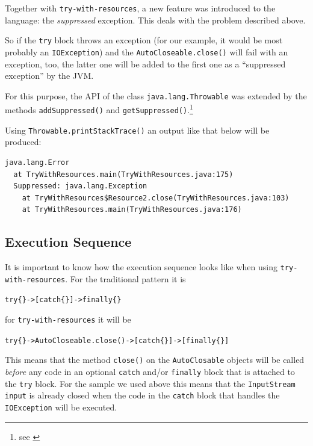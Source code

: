 \documentclass[12pt,a4paper,titlepage, parskip=half, headsepline, footsepline, cleardoubleplain]{scrbook}
\begin{document}
Together with \lstinline|try-with-resources|, a new feature was introduced to the language: the \textit{suppressed} exception. This deals with the problem described above.

So if the \lstinline|try| block throws an exception (for our example, it would be most probably an \lstinline|IOException|) and the \lstinline|AutoCloseable.close()| will fail with an exception, too, the latter one will be added to the first one as a “suppressed exception” by the JVM.

For this purpose, the API of the class \lstinline|java.lang.Throwable| was extended by the methods \lstinline|addSuppressed()| and \lstinline|getSuppressed()|.\footnote{see \autocite{ORACLE_DOC_THROWABLE_CLASS}}

Using \lstinline|Throwable.printStackTrace()| an output like that below will be produced:
\begin{lstlisting}
java.lang.Error
  at TryWithResources.main(TryWithResources.java:175)
  Suppressed: java.lang.Exception
    at TryWithResources$Resource2.close(TryWithResources.java:103)
    at TryWithResources.main(TryWithResources.java:176)
\end{lstlisting}

\subsection{Execution Sequence}\label{sec:ExecutionSequence}
It is important to know how the execution sequence looks like when using \lstinline|try-with-resources|. For the traditional pattern it is\\
\begin{center}
\verb#try{}->[catch{}]->finally{}#
\end{center} 
for \lstinline|try-with-resources| it will be\\ 
\begin{center}
\verb#try{}->AutoCloseable.close()->[catch{}]->[finally{}]#
\end{center}

This means that the method \lstinline|close()| on the \lstinline|AutoClosable| objects will be called \textit{before} any code in an optional \lstinline|catch| and/or \lstinline|finally| block that is attached to the \lstinline|try| block. For the sample we used above this means that the \lstinline|InputStream input| is already closed when the code in the \lstinline|catch| block that handles the \lstinline|IOException| will be executed.
\end{document}
